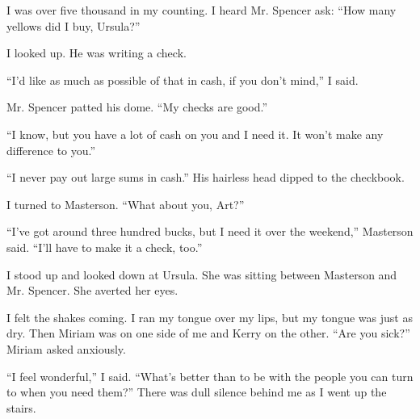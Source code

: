 {I was over five thousand in my counting. I heard Mr. Spencer ask: “How many yellows did I buy, Ursula?”

I looked up. He was writing a check.

“I’d like as much as possible of that in cash, if you don’t mind,” I said.

Mr. Spencer patted his dome. “My checks are good.”

“I know, but you have a lot of cash on you and I need it. It won’t make any difference to you.”

“I never pay out large sums in cash.” His hairless head dipped to the checkbook.

I turned to Masterson. “What about you, Art?”

“I’ve got around three hundred bucks, but I need it over the weekend,” Masterson said. “I’ll have to make it a check, too.”

I stood up and looked down at Ursula. She was sitting between Masterson and Mr. Spencer. She averted her eyes.

I felt the shakes coming. I ran my tongue over my lips, but my tongue was just as dry. Then Miriam was on one side of me and Kerry on the other. “Are you sick?” Miriam asked anxiously.

“I feel wonderful,” I said. “What’s better than to be with the people you can turn to when you need them?” There was dull silence behind me as I went up the stairs.

}

\vspace{2\nbs}
\clearpage
\thispagestyle{empty}


